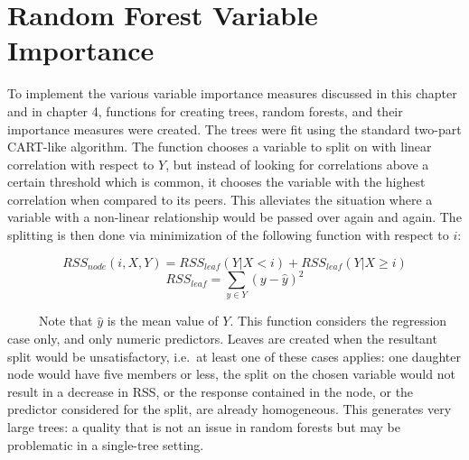 \documentclass[12pt,twoside]{reedthesis}
\begin{document}
  \chapter{Random Forest Variable
  Importance}\label{random-forest-variable-importance}
  
  To implement the various variable importance measures discussed in this
  chapter and in chapter 4, functions for creating trees, random forests,
  and their importance measures were created. The trees were fit using the
  standard two-part CART-like algorithm. The function chooses a variable
  to split on with linear correlation with respect to \(Y\), but instead
  of looking for correlations above a certain threshold which is common,
  it chooses the variable with the highest correlation when compared to
  its peers. This alleviates the situation where a variable with a
  non-linear relationship would be passed over again and again. The
  splitting is then done via minimization of the following function with
  respect to \(i\):
  
  \[RSS_{node} (i,X,Y) = RSS_{leaf}(Y|X <i) + RSS_{leaf}(Y|X \geq i) \]
  \[RSS_{leaf} = \sum_{y \in Y} (y - \hat{y})^2 \]
  
  ~~~~~Note that \(\hat{y}\) is the mean value of \(Y\). This function
  considers the regression case only, and only numeric predictors. Leaves
  are created when the resultant split would be unsatisfactory, i.e.~at
  least one of these cases applies: one daughter node would have five
  members or less, the split on the chosen variable would not result in a
  decrease in RSS, or the response contained in the node, or the predictor
  considered for the split, are already homogeneous. This generates very
  large trees: a quality that is not an issue in random forests but may be
  problematic in a single-tree setting.
  
\end{document}
